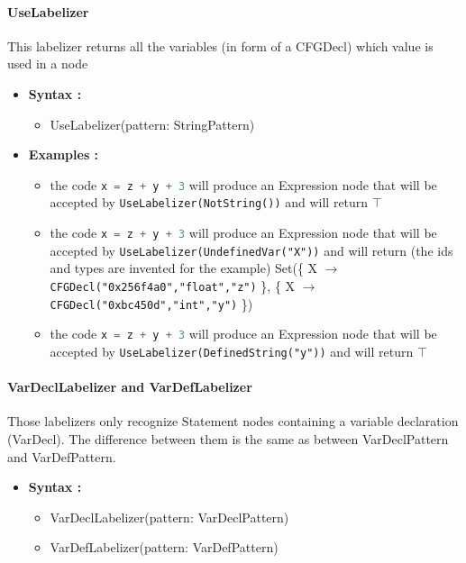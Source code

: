 \documentclass{report}
\begin{document}
\paragraph{UseLabelizer}
This labelizer returns all the variables (in form of a CFGDecl) which value is used in a node
\begin{itemize}
	\item{\textbf{Syntax :}}
	\begin{itemize}
		 \item UseLabelizer(pattern: StringPattern)
	\end{itemize}
	\item{\textbf{Examples :}} 
	\begin{itemize}
		 \item the code \lstinline[language=java]|x = z + y + 3| will produce an Expression node that will be accepted by \lstinline|UseLabelizer(NotString())| and will return $\top$
		 \item the code \lstinline[language=java]|x = z + y + 3| will produce an Expression node that will be accepted by \lstinline|UseLabelizer(UndefinedVar("X"))| and will return (the ids and types are invented for the example) Set(\{ X $\rightarrow$ \lstinline|CFGDecl("0x256f4a0","float","z")| \}, \{ X $\rightarrow$ \lstinline|CFGDecl("0xbc450d","int","y")| \}) 
		 \item the code \lstinline[language=java]|x = z + y + 3| will produce an Expression node that will be accepted by \lstinline|UseLabelizer(DefinedString("y"))| and will return $\top$
	\end{itemize}
\end{itemize}

\paragraph{VarDeclLabelizer and VarDefLabelizer}
Those labelizers only recognize Statement nodes containing a variable declaration (VarDecl). The difference between them
is the same as between VarDeclPattern and VarDefPattern.
\begin{itemize}
	\item{\textbf{Syntax :}}
	\begin{itemize}
		 \item VarDeclLabelizer(pattern: VarDeclPattern)
		 \item VarDefLabelizer(pattern: VarDefPattern)
	\end{itemize}
\end{itemize}
\end{document}
